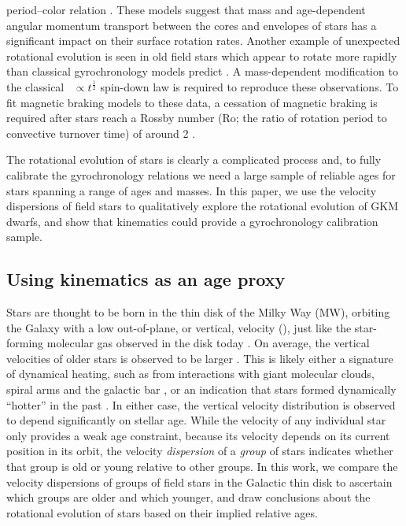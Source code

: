 period--color relation \citep{spada2019}.
These models suggest that mass and age-dependent angular momentum transport
between the cores and envelopes of stars has a significant impact on their
surface rotation rates.
Another example of unexpected rotational evolution is seen in old field stars
which appear to rotate more rapidly than classical gyrochronology models
predict \citep{angus2015, vansaders2016, vansaders2018, metcalfe2019}.
A mass-dependent modification to the classical \prot\ $\propto
t^{\frac{1}{2}}$ spin-down law \citep{skumanich1972} is required to reproduce
these observations.
To fit magnetic braking models to these data, a cessation of magnetic braking
is required after stars reach a Rossby number (Ro; the ratio of rotation
period to convective turnover time) of around 2 \citep{vansaders2016,
vansaders2018}.

The rotational evolution of stars is clearly a complicated process and, to
fully calibrate the gyrochronology relations we need a large sample of
reliable ages for stars spanning a range of ages and masses.
In this paper, we use the velocity dispersions of field stars to qualitatively
explore the rotational evolution of GKM dwarfs, and show that kinematics could
provide a gyrochronology calibration sample.

\subsection{Using kinematics as an age proxy}

Stars are thought to be born in the thin disk of the Milky Way (MW), orbiting
the Galaxy with a low out-of-plane, or vertical, velocity (\vz),
just like the star-forming molecular gas observed in the disk today
\citep[\eg][]{stark1989, stark2005, aumer2009, martig2014, aumer2016}.
On average, the vertical velocities of older stars is observed to be larger
\citep[\eg][]{nordstrom2004, holmberg2007, holmberg2009, aumer2009,
casagrande2011}.
This is likely either a signature of dynamical heating, such as from
interactions with giant molecular clouds, spiral arms and the galactic bar
\citep[see][for a review of secular evolution in the MW]{sellwood2014}, or an
indication that stars formed dynamically ``hotter'' in the past
\citep[e.g.,][]{bird2013}.
In either case, the vertical velocity distribution is observed to depend
significantly on stellar age.
While the velocity of any individual star only provides a weak age constraint,
because its velocity depends on its current position in its orbit, the
velocity {\it dispersion} of a {\it group} of stars indicates whether that
group is old or young relative to other groups.
In this work, we compare the velocity dispersions of groups of field stars in
the Galactic thin disk to ascertain which groups are older and which younger,
and draw conclusions about the rotational evolution of stars based on their
implied relative ages.

